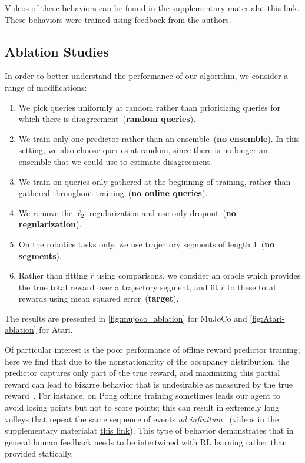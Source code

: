 Videos of these behaviors can be found \ifanony in the supplementary material\else  at \href{https://drive.google.com/drive/folders/0BwcFziBYuA8RM2NTdllSNVNTWTg?resourcekey=0-w4PuSuFvi3odgQXdBDPQ0g&usp=sharing}{this link}\fi.
These behaviors were trained using feedback from the authors.

\subsection{Ablation Studies}
\label{ssec:ablation}

In order to better understand the performance of our algorithm, we consider a range of modifications:

\begin{enumerate}
\item We pick queries uniformly at random rather than prioritizing queries for which there is disagreement~(\textbf{random queries}).
\item We train only one predictor rather than an ensemble~(\textbf{no ensemble}). In this setting, we also choose queries at random, since there is no longer an ensemble that we could use to estimate disagreement.
\item We train on queries only gathered at the beginning of training, rather than gathered throughout training~(\textbf{no online queries}).
\item We remove the $\ell_2$ regularization and use only dropout~(\textbf{no regularization}).
\item On the robotics tasks only, we use trajectory segments of length 1~(\textbf{no segments}).
\item Rather than fitting $\hat{r}$ using comparisons, we consider an oracle which provides the true total reward over a trajectory segment, and fit $\hat{r}$ to these total rewards using mean squared error~(\textbf{target}).
\end{enumerate}

The results are presented in
\autoref{fig:mujoco_ablation} for MuJoCo and \autoref{fig:Atari-ablation} for Atari.

Of particular interest is the poor performance of offline reward predictor training; here we find that due to the nonstationarity of the occupancy distribution, the predictor captures only part of the true reward, and maximizing this partial reward can lead to bizarre behavior that is undesirable as measured by the true reward~\citep{Amodei16}. For instance, on Pong offline training sometimes leads our agent to avoid losing points but not to score points; this can result in extremely long volleys that repeat the same sequence of events \emph{ad infinitum} ~(videos \ifanony in the supplementary material\else at \href{https://drive.google.com/drive/folders/0BwcFziBYuA8RM2NTdllSNVNTWTg?resourcekey=0-w4PuSuFvi3odgQXdBDPQ0g&usp=sharing}{this link}\fi).
This type of behavior demonstrates that in general human feedback needs to be intertwined with RL learning rather than provided statically.

